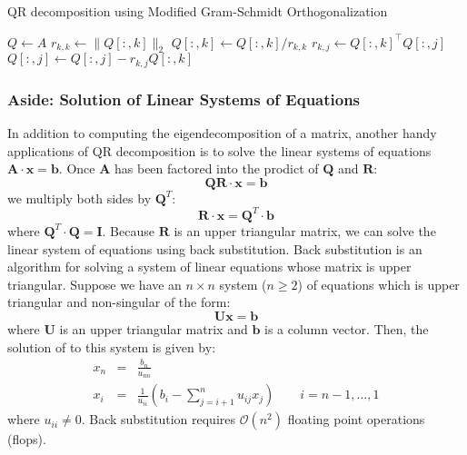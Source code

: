 \documentclass{article}[11pt]
\begin{document}
\begin{algorithm}[H]
   \begin{algorithmic}[1]
   \caption{QR decomposition using Modified Gram-Schmidt Orthogonalization}\label{alg:modgschmidt}
   
   \State $Q \gets A$
         \State $r_{k,k} \gets \|Q[:,k]\|_2$ 
         \State $Q[:,k] \gets Q[:,k] / r_{k,k}$ 
            \State $r_{k,j} \gets Q[:,k]^\top Q[:,j]$ 
            \State $Q[:,j] \gets Q[:,j] - r_{k,j} Q[:,k]$ 
         \EndFor
   \EndFor

   \end{algorithmic}
\end{algorithm}

\subsubsection*{Aside: Solution of Linear Systems of Equations}
In addition to computing the eigendecomposition of a matrix, another handy applications of QR decomposition is to solve the linear systems of equations $\mathbf{A}\cdot\mathbf{x} = \mathbf{b}$.
Once $\mathbf{A}$ has been factored into the prodict of $\mathbf{Q}$ and $\mathbf{R}$:
\begin{equation}
\mathbf{Q}\mathbf{R}\cdot\mathbf{x} = \mathbf{b}
\end{equation}
we multiply both sides by $\mathbf{Q}^{T}$:
\begin{equation}
\mathbf{R}\cdot\mathbf{x} = \mathbf{Q}^{T}\cdot\mathbf{b}
\end{equation}
where $\mathbf{Q}^{T}\cdot\mathbf{Q} = \mathbf{I}$. Because $\mathbf{R}$ is an upper triangular matrix, 
we can solve the linear system of equations using back substitution. Back substitution is an algorithm for solving a system of linear equations whose matrix is upper triangular.
Suppose we have an $n\times{n}$ system ($n\geq{2}$) of equations which is upper triangular and non-singular of the form:
\begin{equation*}
\mathbf{U}\mathbf{x} = \mathbf{b}
\end{equation*}
where $\mathbf{U}$ is an upper triangular matrix and $\mathbf{b}$ is a column vector.
Then, the solution of to this system is given by:
\begin{eqnarray*}
x_{n} & = & \frac{b_{n}}{u_{nn}} \\
x_{i} & = & \frac{1}{u_{ii}}\left(b_{i} - \sum_{j=i+1}^{n}u_{ij}x_{j}\right)\qquad{i=n-1,\dots,1}
\end{eqnarray*}
where $u_{ii}\neq{0}$. Back substitution requires $\mathcal{O}(n^{2})$ floating point operations (flops).
\end{document}
